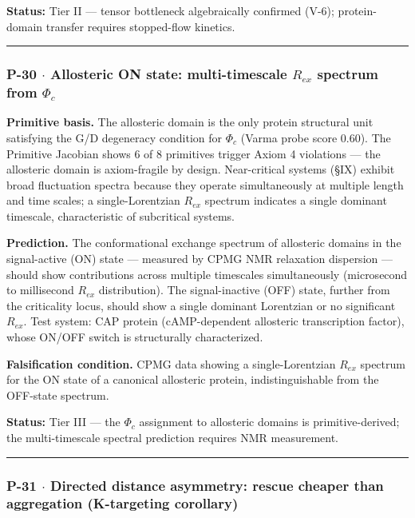 \documentclass[12pt,a4paper]{article}
\begin{document}
\textbf{Status:} Tier II --- tensor bottleneck algebraically confirmed (V-6); protein-domain transfer requires stopped-flow kinetics.

\begin{center}
\rule{0.5\textwidth}{0.4pt}
\end{center}

\subsubsection{P-30 $\cdot$ Allosteric ON state: multi-timescale $R_{ex}$ spectrum from $\Phi_c$}

\textbf{Primitive basis.} The allosteric domain is the only protein structural unit satisfying the G/D degeneracy condition for $\Phi_c$ (Varma probe score 0.60). The Primitive Jacobian shows 6 of 8 primitives trigger Axiom 4 violations --- the allosteric domain is axiom-fragile by design. Near-critical systems (§IX) exhibit broad fluctuation spectra because they operate simultaneously at multiple length and time scales; a single-Lorentzian $R_{ex}$ spectrum indicates a single dominant timescale, characteristic of subcritical systems.

\textbf{Prediction.} The conformational exchange spectrum of allosteric domains in the signal-active (ON) state --- measured by CPMG NMR relaxation dispersion --- should show contributions across multiple timescales simultaneously (microsecond to millisecond $R_{ex}$ distribution). The signal-inactive (OFF) state, further from the criticality locus, should show a single dominant Lorentzian or no significant $R_{ex}$. Test system: CAP protein (cAMP-dependent allosteric transcription factor), whose ON/OFF switch is structurally characterized.

\textbf{Falsification condition.} CPMG data showing a single-Lorentzian $R_{ex}$ spectrum for the ON state of a canonical allosteric protein, indistinguishable from the OFF-state spectrum.

\textbf{Status:} Tier III --- the $\Phi_c$ assignment to allosteric domains is primitive-derived; the multi-timescale spectral prediction requires NMR measurement.

\begin{center}
\rule{0.5\textwidth}{0.4pt}
\end{center}

\subsubsection{P-31 $\cdot$ Directed distance asymmetry: rescue cheaper than aggregation (K-targeting corollary)}
\end{document}
